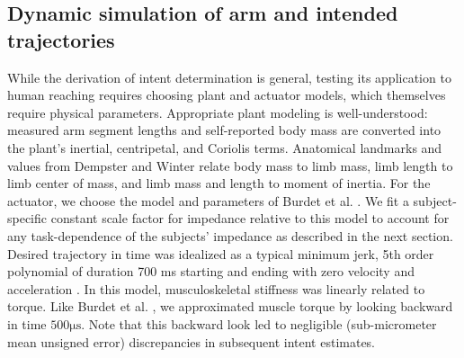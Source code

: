 \subsection*{Dynamic simulation of arm and intended trajectories}
While the derivation of intent determination is general, testing its application to human reaching requires choosing plant and actuator models, which themselves require physical parameters. Appropriate plant modeling is well-understood: measured arm segment lengths and self-reported body mass are converted into the plant's inertial, centripetal, and Coriolis terms. Anatomical landmarks and values from Dempster \cite{dempster1955space} and Winter \cite{winter2009biomechanics} relate body mass to limb mass, limb length to limb center of mass, and limb mass and length to moment of inertia. For the actuator, we choose the model and parameters of Burdet et al. \cite{burdet2006stability}. We fit a subject-specific constant scale factor for impedance relative to this model to account for any task-dependence of the subjects' impedance\cite{gomi1998task} as described in the next section. Desired trajectory in time was idealized as a typical minimum jerk, 5th order polynomial of duration 700 ms starting and ending with zero velocity and acceleration \cite{flash1985coordination}.  In this  model, musculoskeletal stiffness was linearly related to torque. Like Burdet et al. \cite{burdet2006stability}, we approximated muscle torque by looking backward in time $500 \mathrm{\mu s}$. Note that this backward look led to negligible (sub-micrometer mean unsigned error) discrepancies in subsequent intent estimates. 


